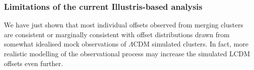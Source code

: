 \documentclass[usenatbib]{mn2e}
\begin{document}
{%
% 
% 

  
\subsubsection{Limitations of the current Illustris-based analysis}
\label{subsec:limitation_of_pvalue}

We have just shown that most individual offsets observed from merging clusters are consistent or marginally consistent with offset distributions drawn from somewhat idealised mock observations of $\Lambda$CDM simulated clusters. 
In fact, more realistic modelling of the observational process may increase the simulated LCDM offsets even further.

}
\end{document}
